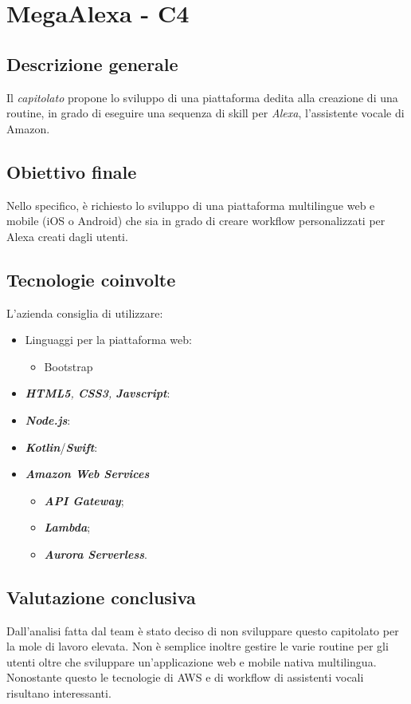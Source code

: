 \section{MegaAlexa - C4} \label{c4}
    \subsection{Descrizione generale}
    Il \textit{capitolato} propone lo sviluppo di una piattaforma
    dedita alla creazione di una routine, in grado di eseguire una sequenza
    di skill per \textit{Alexa}, l'assistente vocale di Amazon.

    \subsection{Obiettivo finale}
    Nello specifico, \`e richiesto lo sviluppo di una piattaforma multilingue web e
    mobile (iOS o Android) che sia in grado di 
    creare workflow personalizzati per Alexa creati dagli utenti.

    \subsection{Tecnologie coinvolte}
    L'azienda consiglia di utilizzare:
    \begin{itemize}
    	\item Linguaggi per la piattaforma web:
    	\begin{itemize}
    		\item Bootstrap
    	\end{itemize}
        \item \textit{\textbf{HTML5}, \textbf{CSS3}, \textbf{Javscript}}:
        \item \textit{\textbf{Node.js}}:
        \item \textit{\textbf{Kotlin}}/\textit{\textbf{Swift}}:
        \item \textit{\textbf{Amazon Web Services}}
            \begin{itemize}
                \item \textit{\textbf{API Gateway}};
                \item \textit{\textbf{Lambda}};
                \item \textit{\textbf{Aurora Serverless}}.
            \end{itemize}
    \end{itemize}

    \subsection{Valutazione conclusiva}
    Dall'analisi fatta dal team è stato deciso di non sviluppare questo capitolato per la mole di lavoro elevata.
    Non è semplice inoltre gestire le varie routine per gli utenti oltre che sviluppare un'applicazione web e mobile nativa multilingua.
    Nonostante questo le tecnologie di AWS e di workflow di assistenti vocali risultano interessanti.

